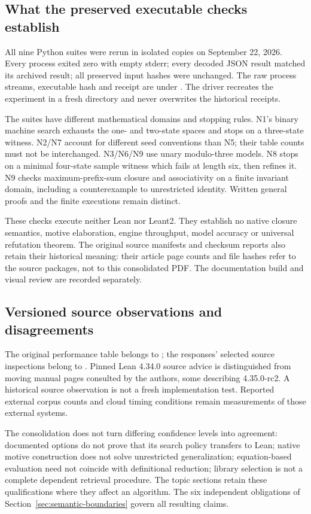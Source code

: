 \subsection{What the preserved executable checks establish}

All nine Python suites were rerun in isolated copies on September 22, 2026.
Every process exited zero with empty stderr; every decoded JSON result matched
its archived result; all preserved input hashes were unchanged. The raw
process streams, executable hash and receipt are under
. The driver
 recreates the experiment in a fresh
directory and never overwrites the historical receipts.

The suites have different mathematical domains and stopping rules. N1's
binary machine search exhausts the one- and two-state spaces and stops on a
three-state witness. N2/N7 account for different seed conventions than N5;
their table counts must not be interchanged. N3/N6/N9 use unary modulo-three
models. N8 stops on a minimal four-state sample witness which fails at length
six, then refines it. N9 checks maximum-prefix-sum closure and associativity
on a finite invariant domain, including a counterexample to unrestricted
identity. Written general proofs and the finite executions remain distinct.

These checks execute neither Lean nor Leant2. They establish no native closure
semantics, motive elaboration, engine throughput, model accuracy or universal
refutation theorem. The original source manifests and checksum reports also
retain their historical meaning: their article page counts and file hashes
refer to the source packages, not to this consolidated PDF. The documentation
build and visual review are recorded separately.

\subsection{Versioned source observations and disagreements}

The original performance table belongs to ; the responses'
selected source inspections belong to . Pinned Lean 4.34.0
source advice is distinguished from moving manual pages consulted by the
authors, some describing 4.35.0-rc2. A historical source observation is not a
fresh implementation test. Reported external corpus counts and cloud timing
conditions remain measurements of those external systems.

The consolidation does not turn differing confidence levels into agreement:
documented  options do not prove that its search policy transfers
to Lean; native motive construction does not solve unrestricted generalization;
equation-based evaluation need not coincide with definitional reduction;
library selection is not a complete dependent retrieval procedure. The
topic sections retain these qualifications where they affect an algorithm.
The six independent obligations of
Section~\ref{sec:semantic-boundaries} govern all resulting claims.
